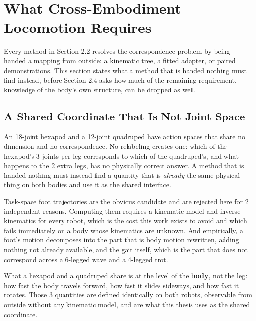 \documentclass[12pt,a4paper,oneside]{report}
\begin{document}
\section{What Cross-Embodiment Locomotion Requires}
Every method in Section 2.2 resolves the correspondence problem by being handed a mapping from
outside: a kinematic tree, a fitted adapter, or paired demonstrations. This section states what a
method that is handed nothing must find instead, before Section 2.4 asks how much of the remaining
requirement, knowledge of the body's own structure, can be dropped as well.

\subsection{A Shared Coordinate That Is Not Joint Space}
An 18-joint hexapod and a 12-joint quadruped have action spaces that share no dimension and no
correspondence. No relabeling creates one: which of the hexapod's 3 joints per leg corresponds to
which of the quadruped's, and what happens to the 2 extra legs, has no physically correct answer.
A method that is handed nothing must instead find a quantity that is \emph{already} the same physical
thing on both bodies and use it as the shared interface.

Task-space foot trajectories are the obvious candidate and are rejected here for 2 independent
reasons. Computing them requires a kinematic model and inverse kinematics for every robot, which is
the cost this work exists to avoid and which fails immediately on a body whose kinematics are unknown.
And empirically, a foot's motion decomposes into the part that is body motion rewritten, adding
nothing not already available, and the gait itself, which is the part that does not
correspond across a 6-legged wave and a 4-legged trot.

What a hexapod and a quadruped share is at the level of the \textbf{body}, not the leg: how
fast the body travels forward, how fast it slides sideways, and how fast it rotates. Those 3
quantities are defined identically on both robots, observable from outside without any kinematic
model, and are what this thesis uses as the shared coordinate.
\end{document}
